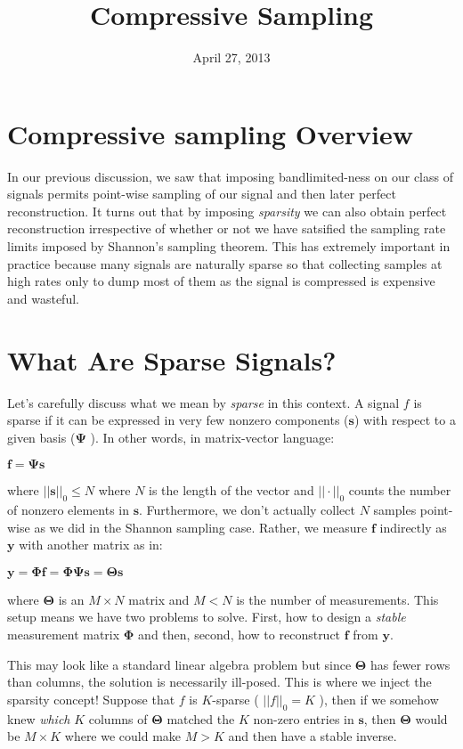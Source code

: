 \documentclass[letterpaper,10pt,english]{/usr/lib/python2.7/site-packages/sphinx/texinputs/sphinxhowto}
\title{Compressive Sampling}
\date{April 27, 2013}
\author{}
\begin{document}
        
            \maketitle
        

        


        \section{Compressive sampling Overview
}In our previous discussion, we saw that imposing bandlimited-ness on our
class of signals permits point-wise sampling of our signal and then
later perfect reconstruction. It turns out that by imposing
\emph{sparsity} we can also obtain perfect reconstruction irrespective
of whether or not we have satsified the sampling rate limits imposed by
Shannon's sampling theorem. This has extremely important in practice
because many signals are naturally sparse so that collecting samples at
high rates only to dump most of them as the signal is compressed is
expensive and wasteful.
\section{What Are Sparse Signals?
}Let's carefully discuss what we mean by \emph{sparse} in this context. A
signal $f$ is sparse if it can be expressed in very few nonzero
components ($\mathbf{s}$) with respect to a given basis ($\mathbf{\Psi}$
). In other words, in matrix-vector language:

$\mathbf{f} = \mathbf{\Psi} \mathbf{s}$

where $|| \mathbf{s} ||_0 \leq N$ where $N$ is the length of the vector
and $|| \cdot||_0$ counts the number of nonzero elements in
$\mathbf{s}$. Furthermore, we don't actually collect $N$ samples
point-wise as we did in the Shannon sampling case. Rather, we measure
$\mathbf{f}$ indirectly as $\mathbf{y}$ with another matrix as in:

$\mathbf{y} = \mathbf{\Phi f} = \mathbf{\Phi} \mathbf{\Psi} \mathbf{s} = \mathbf{\Theta s}$

where $\mathbf{\Theta}$ is an $M \times N$ matrix and $M < N$ is the
number of measurements. This setup means we have two problems to solve.
First, how to design a \emph{stable} measurement matrix $\mathbf{\Phi}$
and then, second, how to reconstruct $\mathbf{f}$ from $\mathbf{y}$.

This may look like a standard linear algebra problem but since
$\mathbf{\Theta}$ has fewer rows than columns, the solution is
necessarily ill-posed. This is where we inject the sparsity concept!
Suppose that $f$ is $K$-sparse ( $||f||_0=K$ ), then if we somehow knew
\emph{which} $K$ columns of $\mathbf{\Theta}$ matched the $K$ non-zero
entries in $\mathbf{s}$, then $\mathbf{\Theta}$ would be $M \times K$
where we could make $M > K$ and then have a stable inverse.
\end{document}
